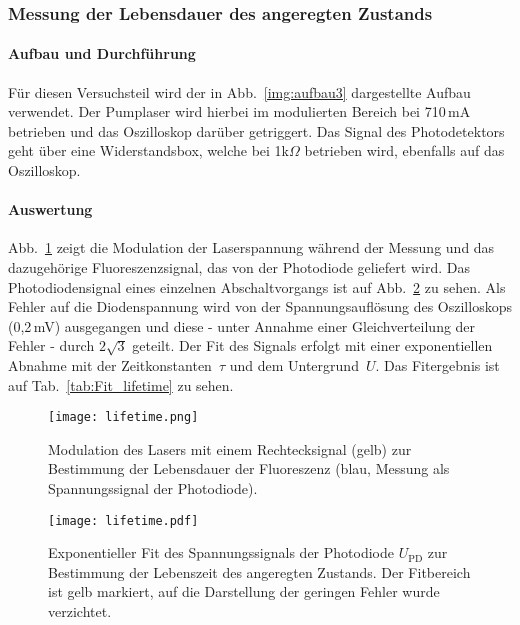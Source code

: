 \FloatBarrier


\subsubsection{Messung der Lebensdauer des angeregten Zustands}

\paragraph{Aufbau und Durchführung}

Für diesen Versuchsteil wird der in Abb.~\ref{img:aufbau3} dargestellte Aufbau verwendet.
Der Pumplaser wird hierbei im modulierten Bereich bei 710\,mA betrieben und das Oszilloskop darüber getriggert. Das Signal des Photodetektors geht über eine Widerstandsbox, welche bei 1k$\Omega$ betrieben wird, ebenfalls auf das Oszilloskop.

\paragraph{Auswertung}
Abb.~\ref{img:Lifetime} zeigt die Modulation der Laserspannung während der Messung und das
dazugehörige Fluoreszenzsignal, das von der Photodiode geliefert wird.
Das Photodiodensignal eines einzelnen Abschaltvorgangs ist auf Abb.~\ref{img:LifetimeFit} zu sehen. 
Als Fehler auf die Diodenspannung wird von der Spannungsauflösung des Oszilloskops
(0,2\,mV) ausgegangen und diese - unter Annahme einer Gleichverteilung der Fehler - durch
$2\sqrt{3}$ geteilt.
Der Fit des Signals erfolgt mit einer exponentiellen Abnahme mit der Zeitkonstanten~$\tau$ und dem
Untergrund~$U$. Das Fitergebnis ist auf Tab.~\ref{tab:Fit_lifetime} zu sehen.


\begin{figure}[H]
\begin{center}
  \texttt{[image: lifetime.png]}
  \caption{Modulation des Lasers mit einem Rechtecksignal (gelb) zur Bestimmung der Lebensdauer der
  Fluoreszenz (blau, Messung als Spannungssignal der Photodiode).}
  \label{img:Lifetime}
\end{center}
\end{figure}


\begin{figure}[H]
\begin{center}
  \texttt{[image: lifetime.pdf]}
  \caption{Exponentieller Fit des Spannungssignals der Photodiode $U_{\text{PD}}$ zur Bestimmung der
  Lebenszeit des angeregten Zustands. Der Fitbereich ist gelb markiert, auf die Darstellung der geringen Fehler
  wurde verzichtet.}
  \label{img:LifetimeFit}
\end{center}
\end{figure}

